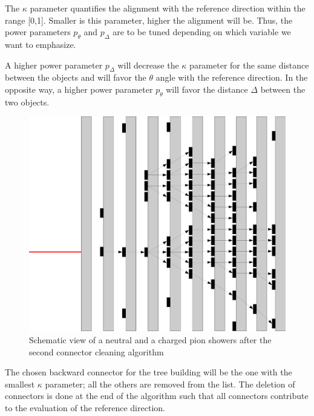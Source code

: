 \documentclass[cits]{JINST}
\begin{document}
The $\kappa$ parameter quantifies the alignment with the reference direction within the range [0,1]. Smaller is this parameter, higher the alignment will be. Thus, the power parameters $p_{\theta}$ and $p_{\Delta}$ are to be tuned depending on which variable we want to emphasize. 

A higher power parameter $p_{\Delta}$ will decrease the $\kappa$ parameter for the same distance between the objects and will favor the $\theta$ angle with the reference direction. In the opposite way, a higher power parameter $p_{\theta}$ will favor the distance $\Delta$ between the two objects. 

\begin{figure}
  \vspace{-30pt}
  \begin{center}
    \includegraphics[width=\linewidth]{ConnectorCleaning2.pdf}
  \end{center}
  \vspace{-10pt}
  \caption{\label{ARBOR_CONNECTOR_CLEANING_2} Schematic view of a neutral and a charged pion showers after the second connector cleaning algorithm}
  \vspace{-30pt}
\end{figure}

The chosen backward connector for the tree building will be the one with the smallest $\kappa$ parameter; all the others are removed from the list. The deletion of connectors is done at the end of the algorithm such that all connectors contribute to the evaluation of the reference direction.
\end{document}
